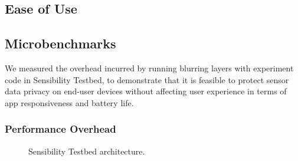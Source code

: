 \subsection{Ease of Use}\label{sec-ease}




\subsection{Microbenchmarks}\label{sec-benchmark}

We measured the overhead incurred by running blurring layers with 
experiment code in Sensibility Testbed, to demonstrate that it is 
feasible to protect sensor data privacy on end-user devices without 
affecting user experience in terms of app responsiveness and battery life.

\subsubsection{Performance Overhead}

\begin{figure}
\caption{\small Sensibility Testbed architecture.\label{fig-time}}
\end{figure}


